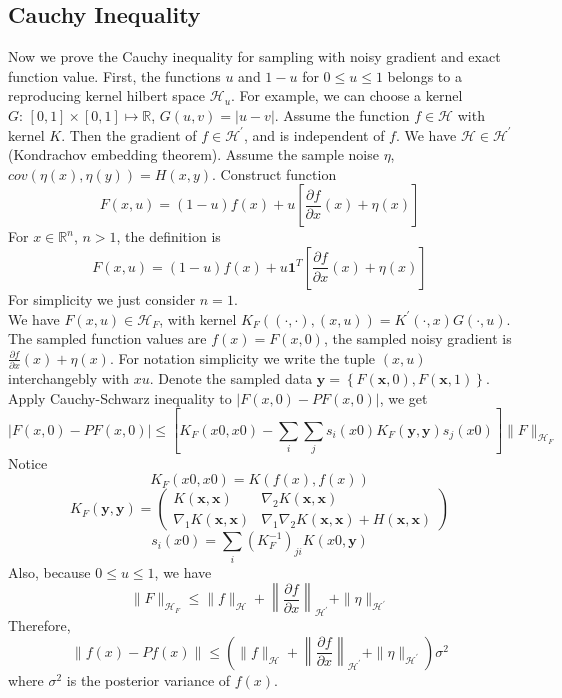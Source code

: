 \documentclass[a4paper,onecolumn]{article}
\begin{document}
\subsection{Cauchy Inequality}
\noindent Now we prove the Cauchy inequality for sampling with noisy gradient and exact function value.
First, the functions $u$ and $1-u$ for $0\le u\le 1$
belongs to a reproducing kernel hilbert space $\mathcal{H}_u$. For example, we can choose a kernel $G:\, [0,1]\times [0,1] \mapsto \mathbb{R}$, $G(u,v) = |u-v|$.
Assume the function $f\in \mathcal{H}$ with kernel $K$. 
Then the gradient of $f\in \mathcal{H}^\prime$, and is independent of $f$. We have $\mathcal{H} \in \mathcal{H}^\prime$ (Kondrachov embedding theorem).
Assume the sample noise $\eta$,
$cov(\eta(x),\eta(y)) = H(x,y)$.
Construct function 
\begin{equation*}
    F(x,u) = (1-u) f(x) + u \left[\frac{\partial f}{\partial x}(x) + \eta(x) \right]
\end{equation*}
For $x\in \mathbb{R}^n$, $n>1$, the definition is 
\begin{equation*}
    F(x,u) = (1-u) f(x) + u \mathbf{1}^T\left[\frac{\partial f}{\partial x}(x) + \eta(x) \right]
\end{equation*}
For simplicity we just consider $n=1$.\\
We have $F(x,u) \in \mathcal{H}_F$, with kernel $K_F\left((\cdot,\cdot),(x,u)\right) = K^\prime(\cdot, x) G(\cdot, u)$.
The sampled function values are $f(x) = F(x,0)$, the sampled noisy gradient is $\frac{\partial f}{\partial x}(x) + \eta(x)$.
For notation simplicity we write the tuple $(x,u)$ interchangebly with $xu$. Denote the sampled data
$\mathbf{y}=\left\{F(\mathbf{x},0), F(\mathbf{x},1)\right\}$.
Apply Cauchy-Schwarz inequality to $\left|F(x,0) - PF(x,0)\right|$, we get
\begin{equation*}
    \left|F(x,0) - PF(x,0)\right| \le \left[
        K_F(x0,x0) - \sum_i\sum_j s_i(x0) K_F(\mathbf{y},\mathbf{y}) s_j(x0)
    \right] \|F\|_{\mathcal{H}_F}
\end{equation*}
Notice
$$
    K_F(x0,x0) = K(f(x),f(x))
$$
\begin{equation*}
    K_F(\mathbf{y},\mathbf{y}) = 
    \begin{pmatrix}
        K(\mathbf{x}, \mathbf{x}) & \nabla_2 K(\mathbf{x}, \mathbf{x})\\
        \nabla_1 K(\mathbf{x}, \mathbf{x}) & \nabla_1 \nabla_2 K(\mathbf{x},\mathbf{x})+H(\mathbf{x},\mathbf{x})
    \end{pmatrix}
\end{equation*}
$$
    s_i(x0) = \sum_i (K_F^{-1})_{ji} K(x0, \mathbf{y})
$$
Also, because $0\le u\le 1$, we have
$$
    \|F\|_{\mathcal{H}_F} \le  \|f\|_\mathcal{H} + \left\|\frac{\partial f}{\partial x}\right\|_{\mathcal{H}^\prime} + \|\eta \|_{\mathcal{H}^\prime}
$$
Therefore,
$$
    \|f(x) - Pf(x)\| \le \left( \|f\|_\mathcal{H} + \left\|\frac{\partial f}{\partial x}\right\|_{\mathcal{H}^\prime} + \|\eta \|_{\mathcal{H}^\prime} \right) \sigma^2
$$
where $\sigma^2$ is the posterior variance of $f(x)$.\\
\end{document}
